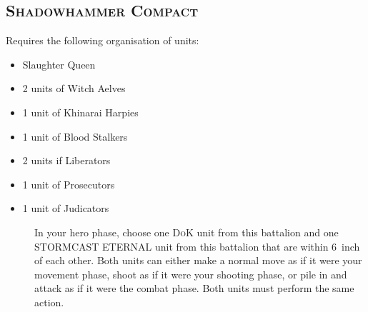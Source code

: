 \subsection{\textsc{Shadowhammer Compact}}
Requires the following organisation of units:
\begin{itemize}
    \tightlist
    \item Slaughter Queen
    \item 2 units of Witch Aelves
    \item 1 unit of Khinarai Harpies
    \item 1 unit of Blood Stalkers
    \item 2 units if Liberators
    \item 1 unit of Prosecutors
    \item 1 unit of Judicators
\end{itemize}
\begin{description}
    \item [] In your hero phase,
        choose one \textsc{DoK} unit from this battalion and one STORMCAST
        ETERNAL unit from this battalion that are within 6~inch of each other.
        Both units can either make a normal move as if it were your movement
        phase, shoot as if it were your shooting phase, or pile in and attack
        as if it were the combat phase. Both units must perform the same
        action.
\end{description}

\newpage
{}


